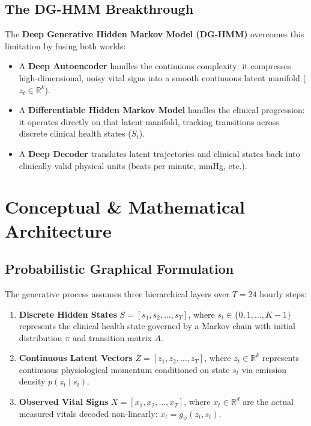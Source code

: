 \documentclass[11pt,a4paper]{article}
\begin{document}
\subsection{The DG-HMM Breakthrough}
The \textbf{Deep Generative Hidden Markov Model (DG-HMM)} overcomes this limitation by fusing both worlds:
\begin{itemize}
    \item A \textbf{Deep Autoencoder} handles the continuous complexity: it compresses high-dimensional, noisy vital signs into a smooth continuous latent manifold ($z_t \in \mathbb{R}^k$).
    \item A \textbf{Differentiable Hidden Markov Model} handles the clinical progression: it operates directly on that latent manifold, tracking transitions across discrete clinical health states ($S_t$).
    \item A \textbf{Deep Decoder} translates latent trajectories and clinical states back into clinically valid physical units (beats per minute, mmHg, etc.).
\end{itemize}

\section{Conceptual \& Mathematical Architecture}

\subsection{Probabilistic Graphical Formulation}
The generative process assumes three hierarchical layers over $T = 24$ hourly steps:
\begin{enumerate}
    \item \textbf{Discrete Hidden States} $S = [s_1, s_2, \dots, s_T]$, where $s_t \in \{0, 1, \dots, K-1\}$ represents the clinical health state governed by a Markov chain with initial distribution $\pi$ and transition matrix $A$.
    \item \textbf{Continuous Latent Vectors} $Z = [z_1, z_2, \dots, z_T]$, where $z_t \in \mathbb{R}^k$ represents continuous physiological momentum conditioned on state $s_t$ via emission density $p(z_t \mid s_t)$.
    \item \textbf{Observed Vital Signs} $X = [x_1, x_2, \dots, x_T]$, where $x_t \in \mathbb{R}^d$ are the actual measured vitals decoded non-linearly: $x_t = g_\psi(z_t, s_t)$.
\end{enumerate}
\end{document}

